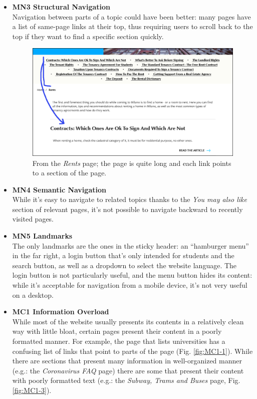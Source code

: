 \begin{itemize}
\begin{figure}[!ht]
        \end{figure}
    \item \textbf{MN3 Structural Navigation}\\
        Navigation between parts of a topic could have been better: many pages have a list of same-page links at their top, thus requiring users to scroll back to the top if they want to find a specific section quickly. 
        \begin{figure}[!ht]
            \centering
            \includegraphics[width=0.9\linewidth]{images/MN3-1.png}
            \captionsetup{justification=centering}
            \caption{From the \emph{Rents} page; the page is quite long and each link points to a section of the page.}
            \label{fig:MN3-1}
        \end{figure} 
    \item \textbf{MN4 Semantic Navigation}\\
        While it's easy to navigate to related topics thanks to the \emph{You may also like} section of relevant pages, it's not possible to navigate backward to recently visited pages.
    \item \textbf{MN5 Landmarks}\\
        The only landmarks are the ones in the sticky header: an ``hamburger menu'' in the far right, a login button that's only intended for students and the search button, as well as a dropdown to select the website language. The login button is not particularly useful, and the menu button hides its content: while it's acceptable for navigation from a mobile device, it's not very useful on a desktop.
    \item \textbf{MC1 Information Overload}\\
        While most of the website usually presents its contents in a relatively clean way with little bloat, certain pages present their content in a poorly formatted manner. 
        For example, the page that lists universities has a confusing list of links that point to parts of the page (Fig. \ref{fig:MC1-1}).
        While there are sections that present many information in well-organized manner (e.g.: the \emph{Coronavirus FAQ} page) there are some that present their content with poorly formatted text (e.g.: the \emph{Subway, Trams and Buses} page, Fig. \ref{fig:MC1-3}).


\end{itemize}
